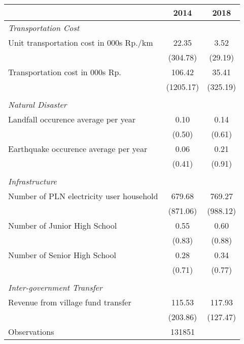 \begin{tabular}{l*{2}{c}}
\hline\hline
                    &        2014&        2018\\
\hline
\emph{Transportation Cost}&            &            \\
\hspace{0.25cm} Unit transportation cost in 000s Rp./km&       22.35&        3.52\\
                    &    (304.78)&     (29.19)\\
\hspace{0.25cm} Transportation cost in 000s Rp.&      106.42&       35.41\\
                    &   (1205.17)&    (325.19)\\
\vspace{0.05em} \\ \emph{Natural Disaster}&            &            \\
\hspace{0.25cm} Landfall occurence average per year&        0.10&        0.14\\
                    &      (0.50)&      (0.61)\\
\hspace{0.25cm} Earthquake occurence average per year&        0.06&        0.21\\
                    &      (0.41)&      (0.91)\\
\vspace{0.05em} \\ \emph{Infrastructure}&            &            \\
\hspace{0.25cm} Number of PLN electricity user household&      679.68&      769.27\\
                    &    (871.06)&    (988.12)\\
\hspace{0.25cm} Number of Junior High School&        0.55&        0.60\\
                    &      (0.83)&      (0.88)\\
\hspace{0.25cm} Number of Senior High School&        0.28&        0.34\\
                    &      (0.71)&      (0.77)\\
\vspace{0.05em} \\ \emph{Inter-government Transfer}&            &            \\
\hspace{0.25cm} Revenue from village fund transfer&      115.53&      117.93\\
                    &    (203.86)&    (127.47)\\
\hline
Observations        &      131851&            \\
\hline\hline
\end{tabular}
